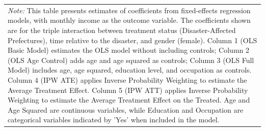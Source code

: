 \documentclass[a4paper,12pt]{article}
\begin{document}
\begin{table}[htbp]
{\begin{tabular}{@{\extracolsep{5pt}}lccccc}
\multicolumn{6}{p{1.50\linewidth}}{\footnotesize \textit{Note:} This table presents estimates of coefficients from fixed-effects regression models, with monthly income as the outcome variable. The coefficients shown are for the triple interaction between treatment status (Disaster-Affected Prefectures), time relative to the disaster, and gender (female). Column 1 (OLS Basic Model) estimates the OLS model without including controls; Column 2 (OLS Age Control) adds age and age squared as controls; Column 3 (OLS Full Model) includes age, age squared, education level, and occupation as controls. Column 4 (IPW ATE) applies Inverse Probability Weighting to estimate the Average Treatment Effect. Column 5 (IPW ATT) applies Inverse Probability Weighting to estimate the Average Treatment Effect on the Treated. Age and Age Squared are continuous variables, while Education and Occupation are categorical variables indicated by 'Yes' when included in the model.}\\
\end{tabular}
}

\label{table:Monthly_Income}


\end{table}




\end{document}
